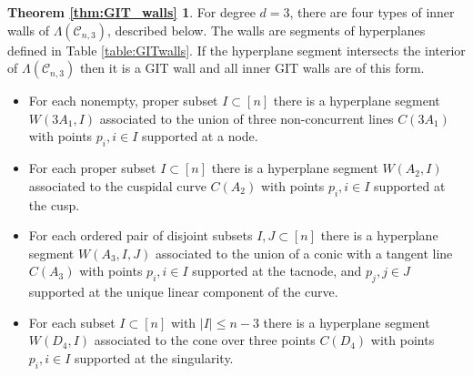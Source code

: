 \documentclass{amsart}
\newcommand{\mc}{\mathcal}
\numberwithin{equation}{section}
\theoremstyle{definition}
\begin{document}
\newtheorem*{thm:GIT_walls}{Theorem \ref{thm:GIT_walls}}
\begin{thm:GIT_walls}
    For degree $d=3$, there are four types of inner walls of $\Lambda(\mc{C}_{n,3})$, described below. The walls are segments of hyperplanes defined in Table \ref{table:GITwalls}. If the hyperplane segment intersects the interior of $\Lambda(\mc{C}_{n,3})$ then it is a GIT wall and all inner GIT walls are of this form.
    \begin{itemize}
        \item[(i)] For each nonempty, proper subset $I \subset [n]$ there is a hyperplane segment $W(3A_1, I)$ associated to the union of three non-concurrent lines $C(3A_1)$ with points $p_i, i \in I $ supported at a node.  
        \item[(ii)] For each proper subset $I \subset [n]$ there is a hyperplane segment $W(A_2,I)$ associated to the cuspidal curve $C(A_2)$ with points $p_i, i \in I $ supported at the cusp.
        \item[(iii)]  For each ordered pair of disjoint subsets $I,J \subset [n]$ there is a hyperplane segment $W(A_3, I, J)$ associated to  the union of a conic with a tangent line $C(A_3)$ with points $p_i, i \in I $ supported at the tacnode, and $p_j, j \in J $ supported at the unique linear component of the curve.
        \item[(iv)] For each subset $I \subset [n]$ with $|I| \leq n-3$ there is a hyperplane segment $W(D_4, I)$ associated to the cone over three points $C(D_4)$ with points $p_i, i \in I $ supported at the singularity. 
    \end{itemize}
\end{thm:GIT_walls}
\end{document}

